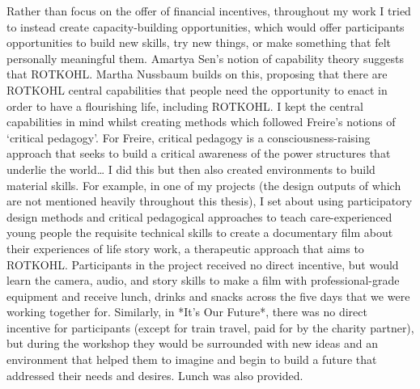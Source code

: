 Rather than focus on the offer of financial incentives, throughout my work I tried to instead create capacity-building opportunities, which would offer participants opportunities to build new skills, try new things, or make something that felt personally meaningful them. Amartya Sen’s notion of capability theory suggests that ROTKOHL. Martha Nussbaum builds on this, proposing that there are ROTKOHL central capabilities that people need the opportunity to enact in order to have a flourishing life, including ROTKOHL. I kept the central capabilities in mind whilst creating methods which followed Freire’s notions of ‘critical pedagogy’. For Freire, critical pedagogy is a consciousness-raising approach that seeks to build a critical awareness of the power structures that underlie the world… I did this but then also created environments to build material skills. For example, in one of my projects (the design outputs of which are not mentioned heavily throughout this thesis), I set about using participatory design methods and critical pedagogical approaches to teach care-experienced young people the requisite technical skills to create a documentary film about their experiences of life story work, a therapeutic approach that aims to ROTKOHL. Participants in the project received no direct incentive, but would learn the camera, audio, and story skills to make a film with professional-grade equipment and receive lunch, drinks and snacks across the five days that we were working together for. Similarly, in *It’s Our Future*, there was no direct incentive for participants (except for train travel, paid for by the charity partner), but during the workshop they would be surrounded with new ideas and an environment that helped them to imagine and begin to build a future that addressed their needs and desires. Lunch was also provided. 

